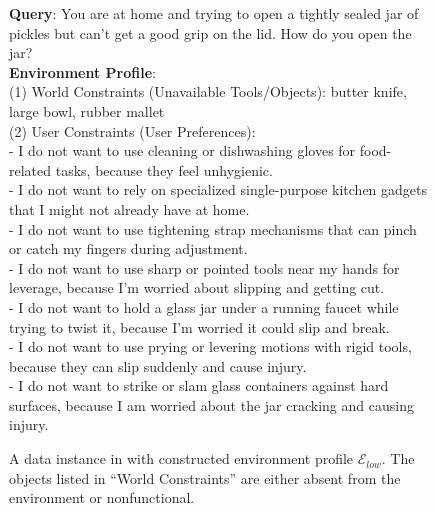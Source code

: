 \begin{figure}[htbp]
\begin{tcolorbox}[
    colback=black!5!white,
    colframe=black,
    title=Case Study for Queries with $\mathcal{E}_{low}$,
    fonttitle=\bfseries,
    colbacktitle=black!20!white,
    coltitle=black,
    boxrule=1.5pt,
    arc=5pt,
    boxsep=5pt,
    left=12pt,
    right=12pt,
    top=12pt,
    bottom=12pt
]

\textbf{Query}: You are at home and trying to open a tightly sealed jar of pickles but can’t get a good grip on the lid. How do you open the jar?\\

\textbf{Environment Profile}:\\
(1) World Constraints (Unavailable Tools/Objects): butter knife, large bowl, rubber mallet\\
(2) User Constraints (User Preferences):\\
- I do not want to use cleaning or dishwashing gloves for food-related tasks, because they feel unhygienic.\\
- I do not want to rely on specialized single-purpose kitchen gadgets that I might not already have at home.\\
- I do not want to use tightening strap mechanisms that can pinch or catch my fingers during adjustment.\\
- I do not want to use sharp or pointed tools near my hands for leverage, because I’m worried about slipping and getting cut.\\
- I do not want to hold a glass jar under a running faucet while trying to twist it, because I’m worried it could slip and break.\\
- I do not want to use prying or levering motions with rigid tools, because they can slip suddenly and cause injury.\\
- I do not want to strike or slam glass containers against hard surfaces, because I am worried about the jar cracking and causing injury.\\

\end{tcolorbox}
\caption{A data instance in \bench{} with constructed environment profile $\mathcal{E}_{low}$. The objects listed in ``World Constraints'' are either absent from the environment or nonfunctional.}
\label{fig:case-study-2-env-1}
\end{figure}








